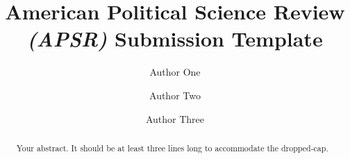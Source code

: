 \documentclass[bibtex,autowc]{apsr_submission}
\title{American Political Science Review \emph{(APSR)} Submission Template}
\author{Author One}
       {Affiliation A}
       {Author One is PhD Candidate, ABC Department, Affiliation A, 12345 NY. (a.1@example.edu)}
\author{Author Two}
       {Affiliation C}
       {Author Two is Assistant Professor, Faculty of Z, Affiliation B, 42813. Corresponding Author (a.2@acme.edu) Additional notes about Author Two.}
\author{Author Three}
       {Affiliation B}
       {Author Three is ...}
\begin{document}
\begin{frontmatter}
\begin{abstract}
Your abstract. It should be at least three lines long to accommodate the dropped-cap. \lipsum[1]
\end{abstract}
\end{frontmatter}





\end{document}
